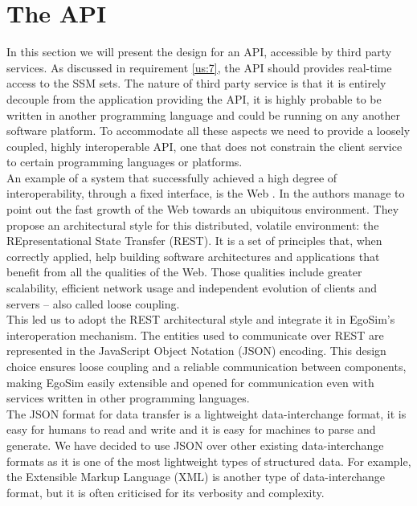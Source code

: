\section{The API} %
\label{sec:api}
In this section we will present the design for an API, accessible by third party services. As discussed in requirement \ref{us:7}, the API should provides real-time access to the SSM sets. The nature of third party service is that it is entirely decouple from the application providing the API, it is highly probable to be written in another programming language and could be running on any another software platform. To accommodate all these aspects we need to provide a loosely coupled, highly interoperable API, one that does not constrain the client service to certain programming languages or platforms.\\

An example of a system that successfully achieved a high degree of interoperability, through a fixed interface, is the Web \cite{coulouris2005distributed}. In \cite{kindberg2001web} the authors manage to point out the fast growth of the Web towards an ubiquitous environment. They propose an architectural style for this distributed, volatile environment: the REpresentational State Transfer (REST). It is a set of principles that, when correctly applied, help building software architectures and applications that benefit from all the qualities of the Web. Those qualities include greater scalability, efficient network usage and independent evolution of clients and servers -- also called loose coupling.\\

This led us to adopt the REST architectural style and integrate it in EgoSim's interoperation mechanism. The entities used to communicate over REST are represented in the JavaScript Object Notation (JSON) encoding. This design choice ensures loose coupling and a reliable communication between components, making EgoSim easily extensible and opened for communication even with services written in other programming languages.\\

The JSON format for data transfer is a lightweight data-interchange format, it is easy for humans to read and write and it is easy for machines to parse and generate. We have decided to use JSON over other existing data-interchange formats as it is one of the most lightweight types of structured data. For example, the Extensible Markup Language (XML) is another type of data-interchange format, but it is often criticised for its verbosity and complexity.\\

